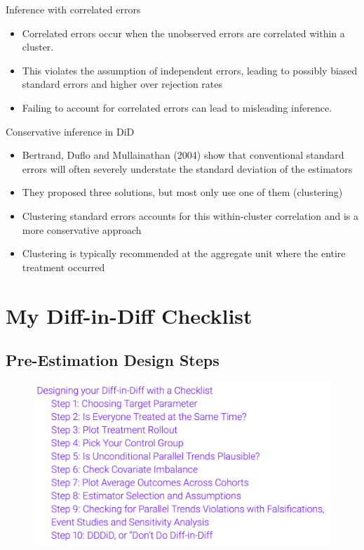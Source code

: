 \documentclass{beamer}
\begin{document}
\begin{frame}{Inference with correlated errors}
  \begin{itemize}
    \item Correlated errors occur when the unobserved errors are correlated within a cluster.
    \item This violates the assumption of independent errors, leading to possibly biased standard errors and higher over rejection rates
    \item Failing to account for correlated errors can lead to misleading inference.
  \end{itemize}
\end{frame}


\begin{frame}{Conservative inference in DiD}
  \begin{itemize}
	\item  Bertrand, Duflo and Mullainathan (2004) show that conventional standard errors will often severely understate the standard deviation of the estimators
	\item They proposed three solutions, but most only use one of them (clustering)
	    \item Clustering standard errors accounts for this within-cluster correlation and is a more conservative approach 
	    \item Clustering is typically recommended at the aggregate unit where the entire treatment occurred

  \end{itemize}
\end{frame}




\section{My Diff-in-Diff Checklist}

\subsection{Pre-Estimation Design Steps}

\begin{frame}
 
\begin{figure}
    \centering
    \includegraphics[width=\textwidth]{./lecture_includes/checklist}
\end{figure}

\end{frame}
\end{document}

